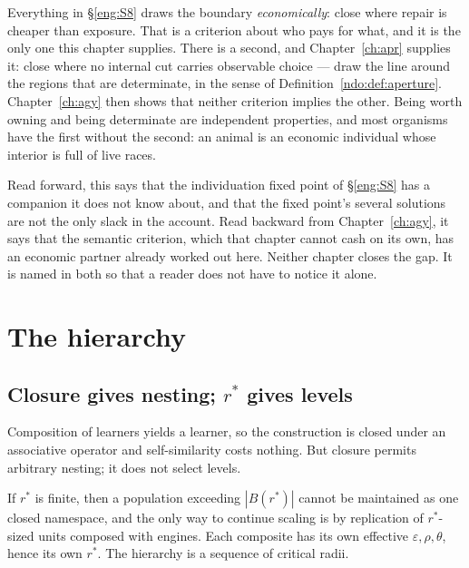 \begin{remark}
\label{eng:rmk:two-criteria}
Everything in \S\ref{eng:S8} draws the boundary \emph{economically}:
close where repair is cheaper than exposure.
That is a criterion about who pays for what, and it is the only one this
chapter supplies.
There is a second, and Chapter~\ref{ch:apr} supplies it: close where no
internal cut carries observable choice --- draw the line around the
regions that are determinate, in the sense of
Definition~\ref{ndo:def:aperture}.
Chapter~\ref{ch:agy} then shows that neither criterion implies the
other.
Being worth owning and being determinate are independent properties, and
most organisms have the first without the second: an animal is an
economic individual whose interior is full of live races.

Read forward, this says that the individuation fixed point of
\S\ref{eng:S8} has a companion it does not know about, and that the
fixed point's several solutions are not the only slack in the account.
Read backward from Chapter~\ref{ch:agy}, it says that the semantic
criterion, which that chapter cannot cash on its own, has an economic
partner already worked out here.
Neither chapter closes the gap.
It is named in both so that a reader does not have to notice it alone.
\end{remark}

\section{The hierarchy}\label{eng:S9}
\label{eng:sec:hier}

\subsection{Closure gives nesting; $r^\ast$ gives levels}\label{eng:S9.1}

Composition of learners yields a learner, so the construction is closed
under an associative operator and self-similarity costs nothing. But
closure permits arbitrary nesting; it does not select levels.

\begin{proposition}\label{eng:levels-forced-finite-r}
If $r^\ast$ is finite, then a population exceeding $|B(r^\ast)|$ cannot be
maintained as one closed namespace, and the only way to continue scaling is
by replication of $r^\ast$-sized units composed with engines. Each
composite has its own effective $\varepsilon, \rho, \theta$, hence its own
$r^\ast$. The hierarchy is a sequence of critical radii.
\end{proposition}

